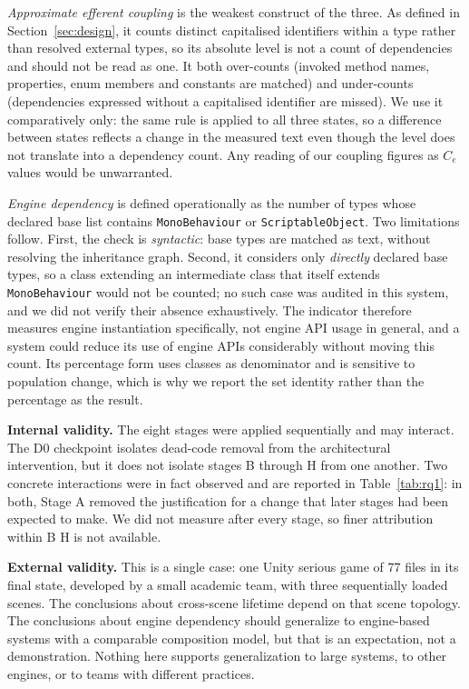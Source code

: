 \documentclass{sbc2019}%
\begin{document}
\emph{Approximate efferent coupling} is the weakest construct of the three. As
defined in Section~\ref{sec:design}, it counts distinct capitalised identifiers
within a type rather than resolved external types, so its absolute level is not
a count of dependencies and should not be read as one. It both over-counts
(invoked method names, properties, enum members and constants are matched) and
under-counts (dependencies expressed without a capitalised identifier are
missed). We use it comparatively only: the same rule is applied to all three
states, so a difference between states reflects a change in the measured text
even though the level does not translate into a dependency count. Any reading of
our coupling figures as $C_e$ values would be unwarranted.

\emph{Engine dependency} is defined operationally as the number of types whose
declared base list contains \texttt{MonoBehaviour} or \texttt{ScriptableObject}.
Two limitations follow. First, the check is \emph{syntactic}: base types are
matched as text, without resolving the inheritance graph. Second, it considers
only \emph{directly} declared base types, so a class extending an intermediate
class that itself extends \texttt{MonoBehaviour} would not be counted; no such
case was audited in this system, and we did not verify their absence
exhaustively. The indicator therefore measures engine instantiation
specifically, not engine API usage in general, and a system could reduce its
use of engine APIs considerably without moving this count. Its percentage form
uses classes as denominator and is sensitive to population change, which is why
we report the set identity rather than the percentage as the result.

\medskip\noindent\textbf{Internal validity.} The eight stages were applied
sequentially and may interact. The D0 checkpoint isolates dead-code removal from
the architectural intervention, but it does not isolate stages B through H from
one another. Two concrete interactions were in fact observed and are reported in
Table~\ref{tab:rq1}: in both, Stage A removed the justification for a change
that later stages had been expected to make. We did not measure after every
stage, so finer attribution within B\textendash{} H is not available.

\medskip\noindent\textbf{External validity.} This is a single case: one
Unity serious game of 77 files in its final state, developed by a small academic
team, with three sequentially loaded scenes. The conclusions about cross-scene
lifetime depend on that scene topology. The conclusions about engine dependency
should generalize to engine-based systems with a comparable composition model,
but that is an expectation, not a demonstration. Nothing here supports
generalization to large systems, to other engines, or to teams with different
practices.
\end{document}
